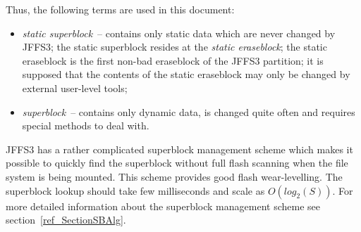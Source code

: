 Thus, the following terms are used in this document:

\begin{itemize}

\item \emph{static superblock}~-- contains only static data which are never
changed by JFFS3; the static superblock resides at the \emph{static
eraseblock}; the static eraseblock is the first \mbox{non-bad} eraseblock of
the JFFS3 partition; it is supposed that the contents of the static eraseblock
may only be changed by external \mbox{user-level} tools;

\item \emph{superblock}~-- contains only dynamic data, is changed quite
often and requires special methods to deal with.

\end{itemize}

JFFS3 has a rather complicated superblock management scheme which makes it
possible to quickly find the superblock without full flash scanning when the
file system is being mounted. This scheme provides good flash
\mbox{wear-levelling}. The superblock lookup should take few milliseconds and
scale as $O(log_2(S))$. For more detailed information about the superblock
management scheme see section~\ref{ref_SectionSBAlg}.

